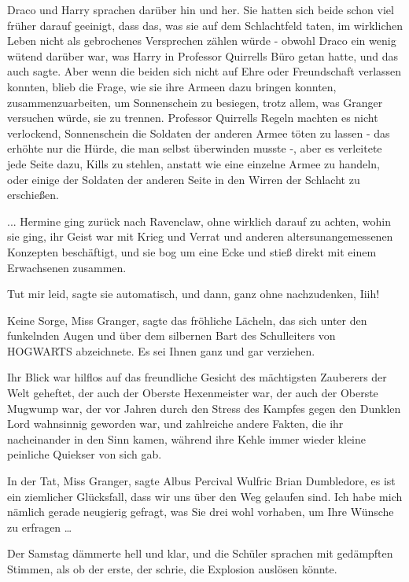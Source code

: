 Draco und Harry sprachen darüber hin und her. Sie hatten sich beide schon viel
früher darauf geeinigt, dass das, was sie auf dem Schlachtfeld taten, im
wirklichen Leben nicht als gebrochenes Versprechen zählen würde - obwohl Draco
ein wenig wütend darüber war, was Harry in Professor Quirrells Büro getan hatte,
und das auch sagte. Aber wenn die beiden sich nicht auf Ehre oder Freundschaft
verlassen konnten, blieb die Frage, wie sie ihre Armeen dazu bringen konnten,
zusammenzuarbeiten, um Sonnenschein zu besiegen, trotz allem, was Granger
versuchen würde, sie zu trennen. Professor Quirrells Regeln machten es nicht
verlockend, Sonnenschein die Soldaten der anderen Armee töten zu lassen - das
erhöhte nur die Hürde, die man selbst überwinden musste -, aber es verleitete
jede Seite dazu, Kills zu stehlen, anstatt wie eine einzelne Armee zu handeln,
oder einige der Soldaten der anderen Seite in den Wirren der Schlacht zu
erschießen.

... Hermine ging zurück nach Ravenclaw, ohne wirklich darauf zu achten, wohin
sie ging, ihr Geist war mit Krieg und Verrat und anderen altersunangemessenen
Konzepten beschäftigt, und sie bog um eine Ecke und stieß direkt mit einem
Erwachsenen zusammen.

\glqq{}Tut mir leid\grqq{}, sagte sie automatisch, und dann, ganz ohne
nachzudenken, \glqq{}Iiih!\grqq{}

\glqq{}Keine Sorge, Miss Granger\grqq{}, sagte das fröhliche Lächeln, das sich
unter den funkelnden Augen und über dem silbernen Bart des Schulleiters von
HOGWARTS abzeichnete. \glqq{}Es sei Ihnen ganz und gar verziehen.\grqq{}

Ihr Blick war hilflos auf das freundliche Gesicht des mächtigsten Zauberers der
Welt geheftet, der auch der Oberste Hexenmeister war, der auch der Oberste
Mugwump war, der vor Jahren durch den Stress des Kampfes gegen den Dunklen Lord
wahnsinnig geworden war, und zahlreiche andere Fakten, die ihr nacheinander in
den Sinn kamen, während ihre Kehle immer wieder kleine peinliche Quiekser von
sich gab.

\glqq{}In der Tat, Miss Granger\grqq{}, sagte Albus Percival Wulfric Brian
Dumbledore, \glqq{}es ist ein ziemlicher Glücksfall, dass wir uns über den Weg
gelaufen sind. Ich habe mich nämlich gerade neugierig gefragt, was Sie drei wohl
vorhaben, um Ihre Wünsche zu erfragen …\grqq{}

Der Samstag dämmerte hell und klar, und die Schüler sprachen mit gedämpften
Stimmen, als ob der erste, der schrie, die Explosion auslösen könnte.

